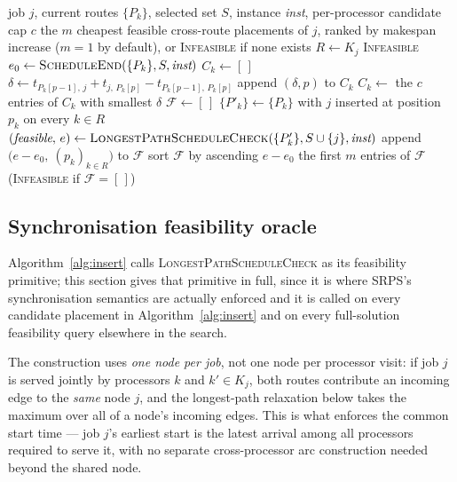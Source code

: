 \documentclass[11pt]{article}
\begin{document}
\begin{algorithm}[t]
\caption{Synchronisation-aware insertion of a job (the repair primitive called within \textsc{ALNSPhase})}
\label{alg:insert}
\begin{algorithmic}[1]
\Require job $j$, current routes $\{P_k\}$, selected set $S$, instance \textit{inst}, per-processor candidate cap $c$
\Ensure the $m$ cheapest feasible cross-route placements of $j$, ranked by makespan increase ($m=1$ by default), or \textsc{Infeasible} if none exists
\State $R \gets K_j$ 
 \Return \textsc{Infeasible} \EndIf
\State $e_0 \gets \textsc{ScheduleEnd}(\{P_k\}, S, \textit{inst})$ 
    \State $C_k \gets [\,]$
        \State $\delta \gets t_{P_k[p-1],\,j} + t_{j,\,P_k[p]} - t_{P_k[p-1],\,P_k[p]}$ 
        \State append $(\delta,p)$ to $C_k$
    \EndFor
    \State $C_k \gets$ the $c$ entries of $C_k$ with smallest $\delta$
\EndFor
\State $\mathcal{F} \gets [\,]$ 
    \State $\{P'_k\} \gets \{P_k\}$ with $j$ inserted at position $p_k$ on every $k\in R$
    \State $(\textit{feasible},\, e) \gets \textsc{LongestPathScheduleCheck}(\{P'_k\}, S\cup\{j\}, \textit{inst})$
        \State append $\bigl(e-e_0,\ (p_k)_{k\in R}\bigr)$ to $\mathcal{F}$
    \EndIf
\EndFor
\State sort $\mathcal{F}$ by ascending $e-e_0$
\State \Return the first $m$ entries of $\mathcal{F}$ (\textsc{Infeasible} if $\mathcal{F}=[\,]$)
\end{algorithmic}
\end{algorithm}

\subsection{Synchronisation feasibility oracle}

Algorithm~\ref{alg:insert} calls \textsc{LongestPathScheduleCheck} as its feasibility primitive; this section gives that primitive in full, since it is where SRPS's synchronisation semantics are actually enforced and it is called on every candidate placement in Algorithm~\ref{alg:insert} and on every full-solution feasibility query elsewhere in the search.

The construction uses \emph{one node per job}, not one node per processor visit: if job $j$ is served jointly by processors $k$ and $k'\in K_j$, both routes contribute an incoming edge to the \emph{same} node $j$, and the longest-path relaxation below takes the maximum over all of a node's incoming edges. This is what enforces the common start time --- job $j$'s earliest start is the latest arrival among all processors required to serve it, with no separate cross-processor arc construction needed beyond the shared node.
\end{document}
